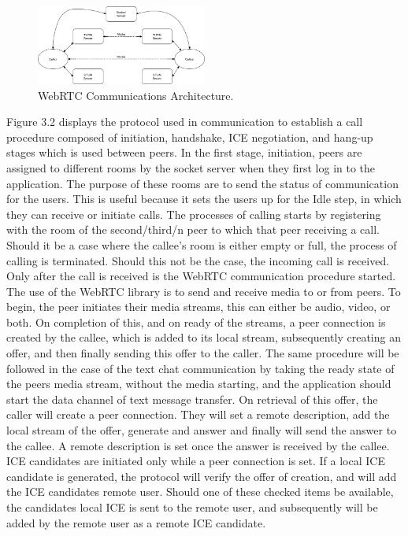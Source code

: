 \begin{figure}[h!]
    \caption{WebRTC Communications Architecture.}
    \label{image:webRTCCommsArch}
    \centering
    \includegraphics[width=0.5\textwidth]{images/WebRTCCommsArchitecture.png}
\end{figure}

Figure 3.2 displays the protocol used in communication to establish a call procedure composed of initiation, handshake, ICE negotiation, and hang-up stages which is used between peers.
In the first stage, initiation, peers are assigned to different rooms by the socket server when they first log in to the application. The purpose of these rooms are to send the status of communication for the users. This is useful because it sets the users up for the Idle step, in which they can receive or initiate calls. The processes of calling starts by registering with the room of the second/third/n peer to which that peer receiving a call. Should it be a case where the callee’s room is either empty or full, the process of calling is terminated. Should this not be the case, the incoming call is received. Only after the call is received is the WebRTC communication procedure started. 
\\The use of the WebRTC library is to send and receive media to or from peers. To begin, the peer initiates their media streams, this can either be audio, video, or both. On completion of this, and on ready of the streams, a peer connection is created by the callee, which is added to its local stream, subsequently creating an offer, and then finally sending this offer to the caller. The same procedure will be followed in the case of the text chat communication by taking the ready state of the peers media stream, without the media starting, and the application should start the data channel of text message transfer. On retrieval of this offer, the caller will create a peer connection. They will set a remote description, add the local stream of the offer, generate and answer and finally will send the answer to the callee. A remote description is set once the answer is received by the callee. ICE candidates are initiated only while a peer connection is set. If a local ICE candidate is generated, the protocol will verify the offer of creation, and will add the ICE candidates remote user. Should one of these checked items be available, the candidates local ICE is sent to the remote user, and subsequently will be added by the remote user as a remote ICE candidate.
